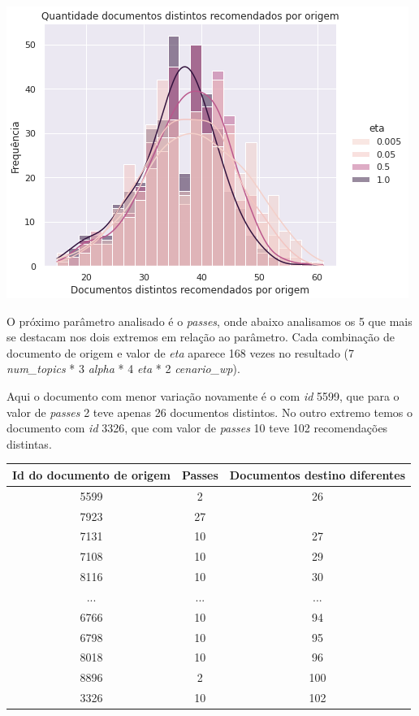 \includegraphics[scale=0.7]{resultados/resources/distribuicao_semelhantes_distintos_eta.png}

O próximo parâmetro analisado é o \textit{passes}, onde abaixo analisamos os 5 que mais se destacam nos dois extremos em relação ao parâmetro.
Cada combinação de documento de origem e valor de \textit{eta} aparece 168 vezes no resultado (7 \textit{num\_topics} * 3 \textit{alpha} * 4 \textit{eta} * 2 \textit{cenario\_wp}).

Aqui o documento com menor variação novamente é o com \textit{id} 5599, que para o valor de \textit{passes} 2 teve apenas 26 documentos distintos. 
No outro extremo temos o documento com \textit{id} 3326, que com valor de \textit{passes} 10 teve 102 recomendações distintas.

\begin{center}
    \begin{tabular}{|c|c|c|}
        \hline
        \textbf{Id do documento de origem} & \textbf{Passes} & \textbf{Documentos destino diferentes} \\
        \hline
        5599 & 2 & 26 \\
        \hline
        7923 & 27 & \\
        \hline
        7131 & 10 & 27 \\
        \hline
        7108 & 10 & 29 \\
        \hline
        8116 & 10 & 30 \\
        \hline
        ... & ... & ... \\
        \hline
        6766 & 10 & 94 \\
        \hline
        6798 & 10 & 95 \\
        \hline
        8018 & 10 & 96 \\
        \hline
        8896 & 2 & 100 \\
        \hline
        3326 & 10 & 102 \\
        \hline
    \end{tabular}
\end{center}

